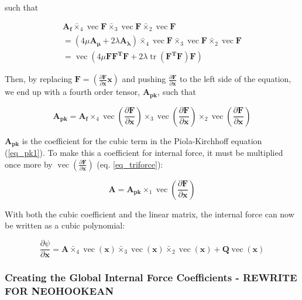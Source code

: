 \documentclass[twocolumn,10pt]{asme2ej}
\DeclareMathOperator{\vect}{vec}
\DeclareMathOperator{\tr}{tr}
\begin{document}
such that

\begin{multline}
    \bm{A_f} \bar{\times}_4 \vect \bm{F} \bar{\times}_3 \vect \bm{F}  \bar{\times}_2 \vect \bm{F}
    \\ = \left( 4\mu\bm{A_{\mu}} + 2\lambda\bm{A_{\lambda}}\right) \bar{\times}_4 \vect \bm{F} \bar{\times}_3 \vect \bm{F} \bar{\times}_2 \vect \bm{F}
    \\ = \vect \left( 4\mu\bm{FF^TF} + 2\lambda\tr\left(\bm{F^TF}\right)\bm{F}\right)
\end{multline}

Then, by replacing $\bm{F} = \left( \frac{\partial \bm{F}}{\partial \bm{x}} \bm{x}\right)$ and pushing $\frac{\partial \bm{F}}{\partial \bm{x}}$ to the left side of the equation, we end up with a fourth order tensor, $\bm{A_{pk}}$, such that

\begin{equation}
\bm{A_{pk}} = \bm{A_f} \times_4 \vect \left(\frac{\partial \bm{F}}{\partial \bm{x}} \right)
\times_3 \vect \left(\frac{\partial \bm{F}}{\partial \bm{x}} \right)
\times_2 \vect \left(\frac{\partial \bm{F}}{\partial \bm{x}} \right)
\end{equation}

$\bm{A_{pk}}$ is the coefficient for the cubic term in the Piola-Kirchhoff equation (\ref{eq_pk1}). To make this a coefficient for internal force, it must be multiplied once more by $\vect \left(\frac{\partial \bm{F}}{\partial \bm{x}} \right)$ (eq. \ref{eq_triforce}):

\begin{equation}
\bm{A} = \bm{A_{pk}} \times_1 \vect \left(\frac{\partial \bm{F}}{\partial \bm{x}} \right)
\label{eq_cubicTerm}
\end{equation}

With both the cubic coefficient and the linear matrix, the internal force can now be written as a cubic polynomial:

\begin{equation}
\frac{\partial \psi}{\partial \bm{x}} = \bm{A} \bar{\times}_4 \vect (\bm{x}) \bar{\times}_3 \vect (\bm{x}) \bar{\times}_2 \vect (\bm{x})+ \bm{Q}\vect (\bm{x})
\label{eq_unreducedCubic}
\end{equation}

\subsubsection{Creating the Global Internal Force Coefficients  - REWRITE FOR NEOHOOKEAN}
\end{document}
